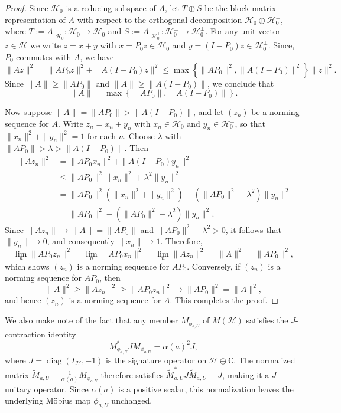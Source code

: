 \documentclass[12pt]{amsart}
\theoremstyle{definition}
\renewcommand{\H}{\mathcal{H}}
\begin{document}
\begin{proof}
Since $\H_0$ is a reducing subspace of $A$, let $T\oplus S$ be the block matrix representation of $A$ with respect to the orthogonal decomposition $\H_0\oplus \H_0^\perp$, where $T:=A|_{\H_0}:\H_0\to \H_0$ and $S:=A|_{\H_0^\perp}:\H_0^\perp\to \H_0^\perp$. For any unit vector $z \in \mathcal{H}$ we write $z = x + y$ with $x = P_0 z \in \mathcal{H}_0$ and $y = (I-P_0)z \in \mathcal{H}_0^{\perp}$. Since, $P_0$ commutes with $A$, we have
\[
\|Az\|^2 = \|AP_0 z\|^2 + \|A(I-P_0)z\|^2 
\leq \max\left\{\|AP_0\|^2, \|A(I-P_0)\|^2\right\}\|z\|^2.
\]
Since $\|A\| \geq \|AP_0\|$ and $\|A\| \geq \|A(I-P_0)\|$, we conclude that
\[
\|A\| = \max\left\{\|AP_0\|, \|A(I-P_0)\|\right\}.
\]


\medskip


\noindent Now suppose $\|A\| = \|AP_0\| > \|A(I-P_0)\|$, and let $(z_n)$ be a norming sequence for $A$. Write $z_n = x_n + y_n$ with $x_n \in \mathcal{H}_0$ and $y_n \in \mathcal{H}_0^{\perp}$, so that 
$\|x_n\|^2 + \|y_n\|^2 = 1$ for each $n$. Choose $\lambda$ with 
$\|AP_0\| > \lambda > \|A(I-P_0)\|$. Then
\begin{align*}
\|Az_n\|^2 &= \|AP_0 x_n\|^2 + \|A(I-P_0)y_n\|^2 \\
&\leq \|AP_0\|^2\|x_n\|^2 + \lambda^2\|y_n\|^2 \\
&= \|AP_0\|^2(\|x_n\|^2 + \|y_n\|^2) 
- (\|AP_0\|^2 - \lambda^2)\|y_n\|^2 \\
&= \|AP_0\|^2 - (\|AP_0\|^2 - \lambda^2)\|y_n\|^2.
\end{align*}
Since $\|Az_n\| \to \|A\| = \|AP_0\|$ and $\|AP_0\|^2 - \lambda^2 > 0$, 
it follows that $\|y_n\| \to 0$, and consequently $\|x_n\| \to 1$. 
Therefore,
\[
\lim_n \|AP_0 z_n\|^2 = \lim_n \|AP_0 x_n\|^2 = \lim_n \|Az_n\|^2 
= \|A\|^2 = \|AP_0\|^2,
\]
which shows $(z_n)$ is a norming sequence for $AP_0$. Conversely, if 
$(z_n)$ is a norming sequence for $AP_0$, then
\[
\|A\|^2 \geq \|Az_n\|^2 \geq \|AP_0 z_n\|^2 \to \|AP_0\|^2 = \|A\|^2,
\]
and hence $(z_n)$ is a norming sequence for $A$. This completes the 
proof.
\end{proof}

\noindent We also make note of the fact that any member $M_{\phi_{a,U}}$ of $M(\H)$ satisfies the $J$-contraction identity
\[
M_{\phi_{a,U}}^{\ast} J M_{\phi_{a,U}} = \alpha(a)^2 J,
\]
where $J = \operatorname{diag}(I_{\mathcal{H}}, -1)$ is the signature operator on
$\mathcal{H} \oplus \mathbb{C}$. The normalized matrix
$\widetilde{M}_{a,U} = \frac{1}{\alpha(a)} M_{\phi_{a,U}}$ therefore satisfies
$\widetilde{M}_{a,U}^{\ast} J \widetilde{M}_{a,U} = J$, making it a
$J$-unitary operator. Since $\alpha(a)$ is a positive scalar, this normalization
leaves the underlying M\"{o}bius map $\phi_{a,U}$ unchanged. 
\end{document}
